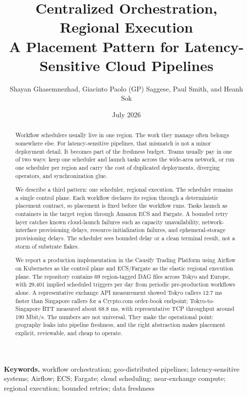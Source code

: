 \documentclass[11pt, reqno]{amsart}
\title[Regional Execution]{Centralized Orchestration, Regional Execution\\
\large A Placement Pattern for Latency-Sensitive Cloud Pipelines}
\author[Ghasemnezhad et al.]{Shayan Ghasemnezhad, Giacinto Paolo (GP) Saggese, Paul Smith, and Heanh Sok}
\date{July 2026}
\begin{document}
\begin{abstract}
Workflow schedulers usually live in one region. The work they manage often belongs somewhere else. For latency-sensitive pipelines, that mismatch is not a minor deployment detail. It becomes part of the freshness budget. Teams usually pay in one of two ways: keep one scheduler and launch tasks across the wide-area network, or run one scheduler per region and carry the cost of duplicated deployments, diverging operators, and synchronization glue.

We describe a third pattern: one scheduler, regional execution. The scheduler remains a single control plane. Each workflow declares its region through a deterministic placement contract, so placement is fixed before the workflow runs. Tasks launch as containers in the target region through Amazon ECS and Fargate. A bounded retry layer catches known cloud-launch failures such as capacity unavailability, network-interface provisioning delays, resource-initialization failures, and ephemeral-storage provisioning delays. The scheduler sees bounded delay or a clean terminal result, not a storm of substrate flakes.

We report a production implementation in the Causify Trading Platform using Airflow on Kubernetes as the control plane and ECS/Fargate as the elastic regional execution plane. The repository contains 69 region-tagged DAG files across Tokyo and Europe, with 29,401 implied scheduled triggers per day from periodic pre-production workflows alone. A representative exchange API measurement showed Tokyo callers 12.7 ms faster than Singapore callers for a Crypto.com order-book endpoint; Tokyo-to-Singapore RTT measured about 68.8 ms, with representative TCP throughput around 190 Mbit/s. The numbers are not universal. They make the operational point: geography leaks into pipeline freshness, and the right abstraction makes placement explicit, reviewable, and cheap to operate.
\end{abstract}

\maketitle
{}

\noindent\textbf{Keywords.} workflow orchestration; geo-distributed pipelines; latency-sensitive systems; Airflow; ECS; Fargate; cloud scheduling; near-exchange compute; regional execution; bounded retries; data freshness
\end{document}
